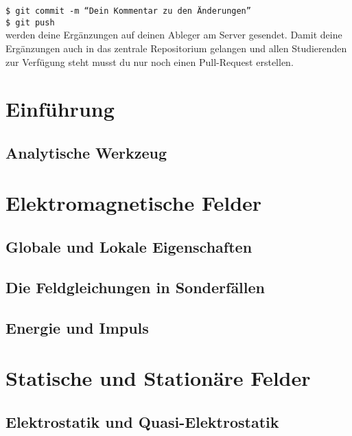 \documentclass[12pt]{article} %
\numberwithin{equation}{subsection}
\begin{document}
	\texttt{\$ git commit -m ``Dein Kommentar zu den Änderungen''}\\
	\texttt{\$ git push}\\
	werden deine Ergänzungen auf deinen Ableger am Server gesendet. Damit deine Ergänzungen auch in das zentrale Repositorium gelangen und allen Studierenden zur Verfügung steht musst du nur noch einen Pull-Request erstellen.
	\newpage
	
	\section{Einführung} %
	\subsection{Analytische Werkzeug}
	
	
	
	\section{Elektromagnetische Felder}
	\subsection{Globale und Lokale Eigenschaften}
	
	
	
	\subsection{Die Feldgleichungen in Sonderfällen}
	
	
	
	\subsection{Energie und Impuls}
	
	
	
	\section{Statische und Stationäre Felder}
	\subsection{Elektrostatik und Quasi-Elektrostatik}
	
	
	
\end{document}
